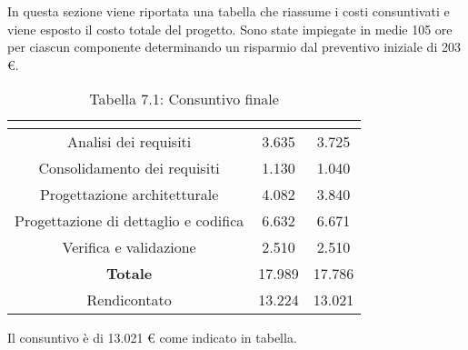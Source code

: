 In questa sezione viene riportata una tabella che riassume i costi consuntivati e viene esposto il costo totale del progetto.
Sono state impiegate in medie 105 ore per ciascun componente determinando un risparmio dal preventivo iniziale di 203 \euro.
\\
\renewcommand{\arraystretch}{1.5}
\begin{table}[H]
\begin{center}
\begin{tabular}{|c|c|c|}
\hline
\rowcolor{title_row}
\textbf{\color{title_text}{Periodo}}  & \textbf{\color{title_text}{Preventivo \euro}} & \textbf{\color{title_text}{Consuntivo \euro}} \\ \hline
Analisi dei requisiti   & 3.635 & 3.725 \\ \hline
Consolidamento dei requisiti   & 1.130 & 1.040 \\ \hline
Progettazione architetturale    & 4.082 & 3.840 \\ \hline
Progettazione di dettaglio e codifica    & 6.632 & 6.671 \\ \hline
Verifica e validazione    & 2.510 & 2.510 \\ \hline
\textbf{Totale}   & 17.989 & 17.786 \\ \hline
Rendicontato   & 13.224 & 13.021 \\ \hline
\end{tabular}
\caption{Tabella 7.1: Consuntivo finale\label{}}
\end{center}
\end{table}
\renewcommand{\arraystretch}{1}

Il consuntivo è di 13.021 \euro{} come indicato in tabella.
\newpage
